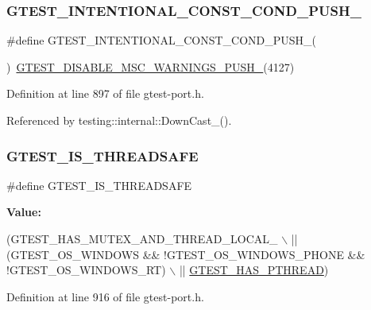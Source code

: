 \subsubsection{\texorpdfstring{G\+T\+E\+S\+T\+\_\+\+I\+N\+T\+E\+N\+T\+I\+O\+N\+A\+L\+\_\+\+C\+O\+N\+S\+T\+\_\+\+C\+O\+N\+D\+\_\+\+P\+U\+S\+H\+\_\+}{GTEST\_INTENTIONAL\_CONST\_COND\_PUSH\_}}
{\footnotesize\ttfamily \#define G\+T\+E\+S\+T\+\_\+\+I\+N\+T\+E\+N\+T\+I\+O\+N\+A\+L\+\_\+\+C\+O\+N\+S\+T\+\_\+\+C\+O\+N\+D\+\_\+\+P\+U\+S\+H\+\_\+(\begin{DoxyParamCaption}{ }\end{DoxyParamCaption})~\hyperlink{gtest-port_8h_a86994cc68e844d8b82089c70408dfc61}{G\+T\+E\+S\+T\+\_\+\+D\+I\+S\+A\+B\+L\+E\+\_\+\+M\+S\+C\+\_\+\+W\+A\+R\+N\+I\+N\+G\+S\+\_\+\+P\+U\+S\+H\+\_\+}(4127)}



Definition at line 897 of file gtest-\/port.\+h.



Referenced by testing\+::internal\+::\+Down\+Cast\+\_\+().

\mbox{\label{gtest-port_8h_a727149862f53b2fb21f6d33cd9323886}} 
\subsubsection{\texorpdfstring{G\+T\+E\+S\+T\+\_\+\+I\+S\+\_\+\+T\+H\+R\+E\+A\+D\+S\+A\+FE}{GTEST\_IS\_THREADSAFE}}
{\footnotesize\ttfamily \#define G\+T\+E\+S\+T\+\_\+\+I\+S\+\_\+\+T\+H\+R\+E\+A\+D\+S\+A\+FE}

{\bfseries Value\+:}
\begin{DoxyCode}
(GTEST\_HAS\_MUTEX\_AND\_THREAD\_LOCAL\_ \(\backslash\)
     || (GTEST\_OS\_WINDOWS && !GTEST\_OS\_WINDOWS\_PHONE && !GTEST\_OS\_WINDOWS\_RT) \(\backslash\)
     || \hyperlink{gtest-port_8h_a3341397e1952de0b9cd88762d4d3ae4b}{GTEST\_HAS\_PTHREAD})
\end{DoxyCode}


Definition at line 916 of file gtest-\/port.\+h.

\mbox{\label{gtest-port_8h_a6e310924e9ce4a9f8fda1b189cc680c4}} 

